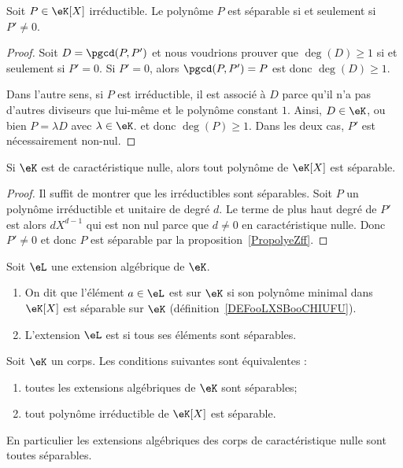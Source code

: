 \begin{proposition}
    Soit \( P\in \eK[X]\) irréductible. Le polynôme \( P\) est séparable si et seulement si \( P'\neq 0\).
\end{proposition}

\begin{proof}
    Soit \( D=\pgcd(P,P')\) et nous voudrions prouver que \( \deg(D)\geq 1\) si et seulement si \( P'=0\). Si \( P'=0\), alors \( \pgcd(P,P')=P\) est donc \( \deg(D)\geq 1\).

    Dans l'autre sens, si \( P\) est irréductible, il est associé à \( D\) parce qu'il n'a pas d'autres diviseurs que lui-même et le polynôme constant \( 1\). Ainsi, \( D \in \eK \), ou bien \( P=\lambda D\) avec \( \lambda\in \eK\). et donc \( \deg(P)\geq 1\). Dans les deux cas, \( P' \) est nécessairement non-nul.
\end{proof}

\begin{corollary}   \label{CorUjfJSE}
    Si \( \eK\) est de caractéristique nulle, alors tout polynôme de \( \eK[X]\) est séparable.
\end{corollary}

\begin{proof}
    Il suffit de montrer que les irréductibles sont séparables. Soit \( P\) un polynôme irréductible et unitaire de degré \( d\). Le terme de plus haut degré de \( P'\) est alors \( dX^{d-1}\) qui est non nul parce que \( d\neq 0\) en caractéristique nulle. Donc \( P'\neq 0\) et donc \( P\) est séparable par la proposition~\ref{PropolyeZff}.
\end{proof}

\begin{definition}
    Soit \( \eL\) une extension algébrique de \( \eK\).
    \begin{enumerate}
        \item
            On dit que l'élément \( a\in \eL\) est  sur \( \eK\) si son polynôme minimal dans \( \eK[X]\) est séparable sur \( \eK\) (définition~\ref{DEFooLXSBooCHIUFU}).
        \item
            L'extension \( \eL\) est  si tous ses éléments sont séparables.
    \end{enumerate}
\end{definition}

\begin{proposition} \label{PropUmxJVw}
    Soit \( \eK\) un corps. Les conditions suivantes sont équivalentes :
    \begin{enumerate}
        \item       \label{ITEMooUSKRooDmsGmw}
            toutes les extensions algébriques de \( \eK\) sont séparables;
        \item       \label{ITEMooJGWLooKInxSG}
            tout polynôme irréductible de \( \eK[X]\) est séparable.
    \end{enumerate}
    En particulier les extensions algébriques des corps de caractéristique nulle sont toutes séparables.
\end{proposition}

